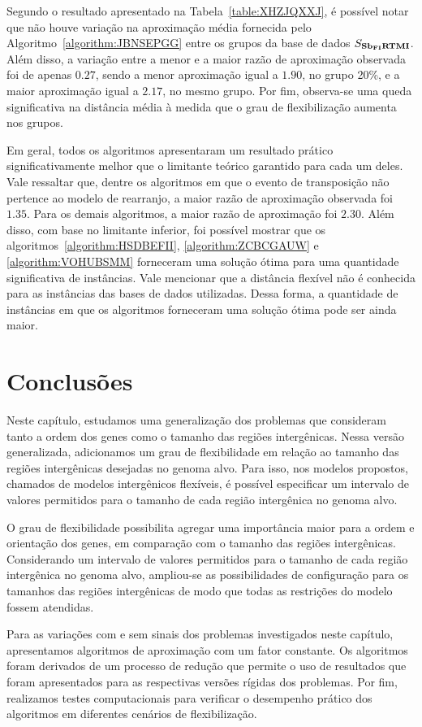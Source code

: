 

Segundo o resultado apresentado na Tabela~\ref{table:XHZJQXXJ}, é possível notar que não houve variação na aproximação média fornecida pelo Algoritmo~\ref{algorithm:JBNSEPGG} entre os grupos da base de dados $S_{\textbf{Sb\textsubscript{FI}RTMI}}{}$. Além disso, a variação entre a menor e a maior razão de aproximação observada foi de apenas $0.27$, sendo a menor aproximação igual a $1.90$, no grupo 20\%, e a maior aproximação igual a $2.17$, no mesmo grupo. Por fim, observa-se uma queda significativa na distância média à medida que o grau de flexibilização aumenta nos grupos.

Em geral, todos os algoritmos apresentaram um resultado prático significativamente melhor que o limitante teórico garantido para cada um deles. Vale ressaltar que, dentre os algoritmos em que o evento de transposição não pertence ao modelo de rearranjo, a maior razão de aproximação observada foi $1.35$. Para os demais algoritmos, a maior razão de aproximação foi $2.30$. Além disso, com base no limitante inferior, foi possível mostrar que os algoritmos~\ref{algorithm:HSDBEFII}, \ref{algorithm:ZCBCGAUW} e \ref{algorithm:VOHUBSMM} forneceram uma solução ótima para uma quantidade significativa de instâncias. Vale mencionar que a distância flexível não é conhecida para as instâncias das bases de dados utilizadas. Dessa forma, a quantidade de instâncias em que os algoritmos forneceram uma solução ótima pode ser ainda maior. 

\section{Conclusões}

Neste capítulo, estudamos uma generalização dos problemas que consideram tanto a ordem dos genes como o tamanho das regiões intergênicas. Nessa versão generalizada, adicionamos um grau de flexibilidade em relação ao tamanho das regiões intergênicas desejadas no genoma alvo. Para isso, nos modelos propostos, chamados de modelos intergênicos flexíveis, é possível especificar um intervalo de valores permitidos para o tamanho de cada região intergênica no genoma alvo. 

O grau de flexibilidade possibilita agregar uma importância maior para a ordem e orientação dos genes, em comparação com o tamanho das regiões intergênicas. Considerando um intervalo de valores permitidos para o tamanho de cada região intergênica no genoma alvo, ampliou-se as possibilidades de configuração para os tamanhos das regiões intergênicas de modo que todas as restrições do modelo fossem atendidas.

Para as variações com e sem sinais dos problemas investigados neste capítulo, apresentamos algoritmos de aproximação com um fator constante. Os algoritmos foram derivados de um processo de redução que permite o uso de resultados que foram apresentados para as respectivas versões rígidas dos problemas. Por fim, realizamos testes computacionais para verificar o desempenho prático dos algoritmos em diferentes cenários de flexibilização.